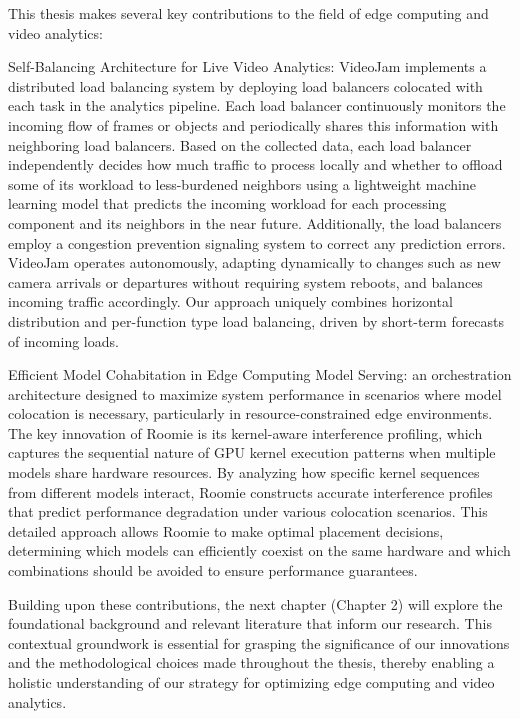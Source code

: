 This thesis makes several key contributions to the field of edge computing and video analytics:

Self-Balancing Architecture for Live Video Analytics: VideoJam implements a distributed load balancing system by deploying load balancers colocated with each task in the analytics pipeline. Each load balancer continuously monitors the incoming flow of frames or objects and periodically shares this information with neighboring load balancers. Based on the collected data, each load balancer independently decides how much traffic to process locally and whether to offload some of its workload to less-burdened neighbors using a lightweight machine learning model that predicts the incoming workload for each processing component and its neighbors in the near future. Additionally, the load balancers employ a congestion prevention signaling system to correct any prediction errors. VideoJam operates autonomously, adapting dynamically to changes such as new camera arrivals or departures without requiring system reboots, and balances incoming traffic accordingly. Our approach uniquely combines horizontal distribution and per-function type load balancing, driven by short-term forecasts of incoming loads.

Efficient Model Cohabitation in Edge Computing Model Serving: an orchestration architecture designed to maximize system performance in scenarios where model colocation is necessary, particularly in resource-constrained edge environments. The key innovation of Roomie is its kernel-aware interference profiling, which captures the sequential nature of GPU kernel execution patterns when multiple models share hardware resources. By analyzing how specific kernel sequences from different models interact, Roomie constructs accurate interference profiles that predict performance degradation under various colocation scenarios. This detailed approach allows Roomie to make optimal placement decisions, determining which models can efficiently coexist on the same hardware and which combinations should be avoided to ensure performance guarantees.

Building upon these contributions, the next chapter (Chapter 2) will explore the foundational background and relevant literature that inform our research. This contextual groundwork is essential for grasping the significance of our innovations and the methodological choices made throughout the thesis, thereby enabling a holistic understanding of our strategy for optimizing edge computing and video analytics.